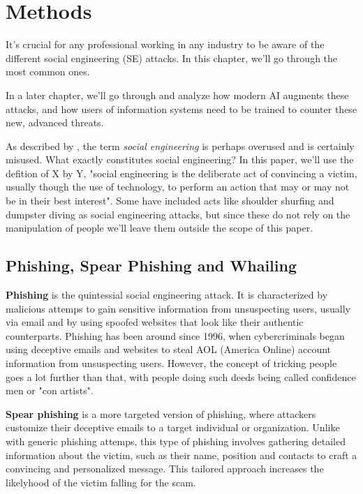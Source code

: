 
\chapter{Methods\label{methods}}

It's crucial for any professional working in any industry to be aware of the different social engineering (SE) attacks. In this chapter, we'll go through the most common ones.

In a later chapter, we'll go through and analyze how modern AI augments these attacks, and how users of information systems need to be trained to counter these new, advanced threats.

As described by \cite{abiteboul}, the term \textit{social engineering} is perhaps overused and is certainly misused. What exactly constitutes social engineering? In this paper, we'll use the defition of X by Y, "social engineering is the deliberate act of convincing a victim, usually though the use of technology, to perform an action that may or may not be in their best interest". Some have included acts like shoulder shurfing and dumpster diving as social engineering attacks, but since these do not rely on the manipulation of people we'll leave them outside the scope of this paper.

\section{Phishing, Spear Phishing and Whailing}

\textbf{Phishing} is the quintessial social engineering attack. It is characterized by malicious attemps to gain sensitive information from unsuspecting users, usually via email and by using spoofed websites that look like their authentic counterparts. Phishing has been around since 1996, when cybercriminals began using deceptive emails and websites to steal AOL (America Online) account information from unsuspecting users. However, the concept of tricking people goes a lot further than that, with people doing such deeds being called confidence men or "con artists". 

\textbf{Spear phishing} is a more targeted version of phishing, where attackers customize their deceptive emails to a target individual or organization. Unlike with generic phishing attemps, this type of phishing involves gathering detailed information about the victim, such as their name, position and contacts to craft a convincing and personalized message. This tailored approach increases the likelyhood of the victim falling for the scam.

